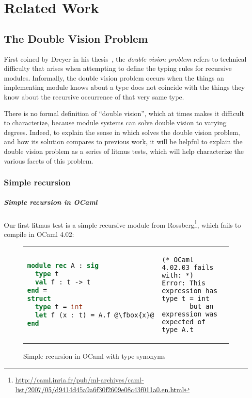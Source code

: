 \chapter{Related Work}

\section{The Double Vision Problem}

First coined by Dreyer in his thesis~\cite{dreyer:thesis}, the
\emph{double vision problem} refers to technical difficulty that arises
when attempting to define the typing rules for recursive modules.
Informally, the double vision problem occurs when the things an implementing
module knows about a type does not coincide with the things they know about the
recursive occurrence of that very same type.

There is no formal definition of ``double vision'', which at times makes it
difficult to characterize, because module systems can solve double vision
to varying degrees.  Indeed, to explain the sense in which \Backpack{} solves the double
vision problem, and how its solution compares to previous work, it will be
helpful to explain the double vision problem as a series of litmus tests,
which will help characterize the various facets of this problem.

\subsection{Simple recursion}

\paragraph{Simple recursion in OCaml}  Our first litmus test is a simple
recursive module from Rossberg\footnote{\url{http://caml.inria.fr/pub/ml-archives/caml-list/2007/05/d9414d45a9a6f30f2609e08c43f011a0.en.html}}, which fails to compile in OCaml 4.02:

\begin{figure}[H]
\begin{tabular}{p{} p{}}
\begin{lstlisting}[language=ML,escapechar=@]
module rec A : sig
  type t
  val f : t -> t
end =
struct
  type t = int
  let f (x : t) = A.f @\fbox{x}@
end
\end{lstlisting}
&
\begin{verbatim}
(* OCaml 4.02.03 fails with: *)
Error: This expression has type t = int
       but an expression was expected of type A.t
\end{verbatim}
\end{tabular}
\caption{Simple recursion in OCaml with type synonyms}
\label{fig:double-vision-simple-recursion-ocaml-synonym}
\end{figure}


